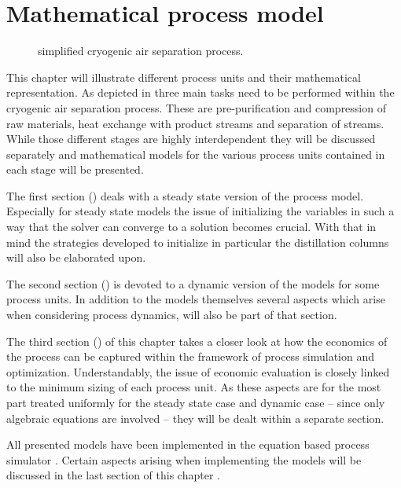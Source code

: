 \chapter{Mathematical process model}
\label{sec:mathprocess}
    \begin{figure}
        \center
        \footnotesize
        
        \caption{simplified cryogenic air separation process.}
        \label{fig:asu_simple}
    \end{figure}

    This chapter will illustrate different process units and their mathematical representation.
    As depicted in  three main tasks need to be performed within the cryogenic air separation process.
    These are pre-purification and compression of raw materials, heat exchange with product streams and separation of streams.
    While those different stages are highly interdependent they will be discussed separately and mathematical
    models for the various process units contained in each stage will be presented.

    The first section () deals with a steady state version of the process model. Especially
    for steady state models the issue of initializing the variables in such a way that the solver can converge to a solution
    becomes crucial. With that in mind the strategies developed to initialize in particular the distillation columns will also
    be elaborated upon.

    The second section () is devoted to a dynamic version of the models for some process units.
    In addition to the models themselves several aspects which arise when considering process dynamics, will also be part
    of that section.

    The third section () of this chapter takes a closer look at how the economics of the process
    can be captured within the framework of process simulation and optimization. Understandably, the issue of economic
    evaluation is closely linked to the minimum sizing of each process unit. As these aspects are for the most
    part treated uniformly for the steady state case and dynamic case -- since only algebraic equations are involved --
    they will be dealt within a separate section.

    All presented models have been implemented in the equation based process simulator \gproms. Certain aspects arising when
    implementing the models will be discussed in the last section of this chapter .


